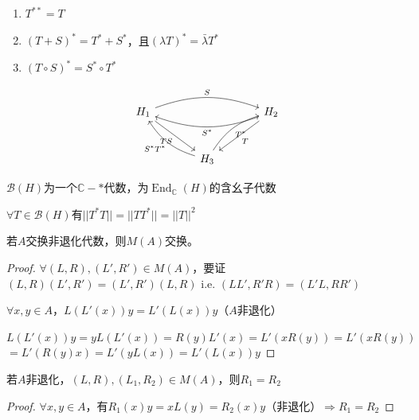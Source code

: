 \documentclass[lang=cn,a4paper,newtx,section]{elegantbook}
\begin{document}
\begin{proposition}
  \begin{enumerate}
    \item $T^{**} = T$
    \item $(T + S)^* = T^* + S^*$，且$(\lambda T)^* = \bar{\lambda}T^*$
    \item $(T \circ S)^* = S^* \circ T^*$
  \end{enumerate}
  
  \begin{equation*}
    \begin{tikzcd}[column sep=large, row sep=large]
      H_1 \arrow[rr, "S", bend left=20] \arrow[dr, "TS"'] & & H_2 \arrow[ll, "S^*", bend left=20] \arrow[dl, "T"] \\
      & H_3 \arrow[ul, "S^*T^*", bend left=20] \arrow[ur, "T^*"', bend left=20] &
    \end{tikzcd}
  \end{equation*}
\end{proposition}

\begin{proposition}
  $\mathcal{B}(H)$为一个$\mathbb{C}-*$代数，为$\operatorname{End}_\mathbb{C}(H)$的含幺子代数
\end{proposition}

\begin{proposition}
  $\forall T \in \mathcal{B}(H)$有$||T^*T|| = ||TT^*|| = ||T||^2$
\end{proposition}

\begin{proposition}
  若$A$交换非退化代数，则$M(A)$交换。
\end{proposition}

\begin{proof}
  $\forall (L, R), (L', R') \in M(A)$，要证$(L, R)(L', R') = (L', R')(L, R)$
  i.e. $(LL', R'R) = (L'L, RR')$
  
  $\forall x, y \in A$，$L(L'(x))y = L'(L(x))y$（$A$非退化）
  
  $L(L'(x))y = yL(L'(x)) = R(y)L'(x) = L'(xR(y)) = L'(xR(y))$
  $= L'(R(y)x) = L'(yL(x)) = L'(L(x))y$
\end{proof}

\begin{proposition}
  若$A$非退化，$(L, R), (L_1, R_2) \in M(A)$，则$R_1 = R_2$
\end{proposition}

\begin{proof}
  $\forall x, y \in A$，有$R_1(x)y = xL(y) = R_2(x)y$（非退化）$\Rightarrow R_1 = R_2$
\end{proof}
\end{document}

